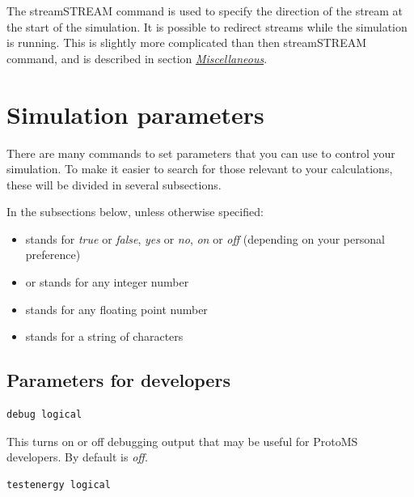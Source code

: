 \documentclass[letterpaper,10pt,english]{sphinxmanual}
\begin{document}
The streamSTREAM command is used to specify the direction of the stream at the start of the simulation. It is possible to redirect streams while the simulation is running. This is slightly more complicated than then streamSTREAM command, and is described in section {\hyperref[protoms:misccmd]{\emph{Miscellaneous}}}.


\section{Simulation parameters}
\label{protoms:parameters}\label{protoms:simulation-parameters}
There are many commands to set parameters that you can use to control your simulation. To make it easier to search for those relevant to your calculations, these will be divided in several subsections.

In the subsections below, unless otherwise specified:
\begin{itemize}
\item {} 
 stands for \emph{true} or \emph{false}, \emph{yes} or \emph{no}, \emph{on} or \emph{off} (depending on your personal preference)

\item {} 
 or  stands for any integer number

\item {} 
 stands for any floating point number

\item {} 
 stands for a string of characters

\end{itemize}


\subsection{Parameters for developers}
\label{protoms:parameters-for-developers}
\begin{Verbatim}[frame=single,commandchars=\\\{\}]
debug logical
\end{Verbatim}

This turns on or off debugging output that may be useful for ProtoMS developers. By default  is \emph{off}.

\begin{Verbatim}[frame=single,commandchars=\\\{\}]
testenergy logical
\end{Verbatim}
\end{document}

